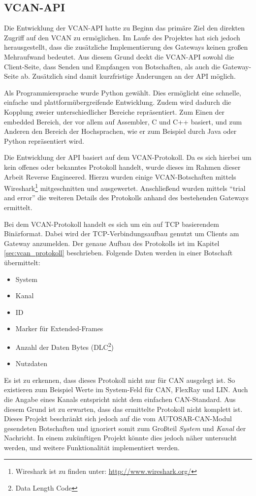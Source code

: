 \documentclass[
  a4paper,					    %
  twoside,
  DIV=calc,     				%
  bibliography=totoc,
  cleardoublepage=empty,
  ngerman,     					%
  final       					%
]{scrbook}
\begin{document}
\subsection{VCAN-API}
\label{sec:VCAN_API}
Die Entwicklung der VCAN-API hatte zu Beginn das primäre Ziel den direkten Zugriff auf den VCAN zu ermöglichen. Im Laufe des Projektes hat sich jedoch herausgestellt, dass die zusätzliche Implementierung des Gateways keinen großen Mehraufwand bedeutet. Aus diesem Grund deckt die VCAN-API sowohl die Client-Seite, dass Senden und Empfangen von Botschaften, als auch die Gateway-Seite ab. Zusätzlich sind damit kurzfristige Änderungen an der API möglich.

Als Programmiersprache wurde Python gewählt. Dies ermöglicht eine schnelle, einfache und plattformübergreifende Entwicklung. Zudem wird dadurch die Kopplung zweier unterschiedlicher Bereiche repräsentiert. Zum Einen der embedded Bereich, der vor allem auf Assembler, C und C++ basiert, und zum Anderen den Bereich der Hochsprachen, wie er zum Beispiel durch Java oder Python repräsentiert wird.

Die Entwicklung der API basiert auf dem VCAN-Protokoll. Da es sich hierbei um kein offenes oder bekanntes Protokoll handelt, wurde dieses im Rahmen dieser Arbeit Reverse Engineered. Hierzu wurden einige VCAN-Botschaften mittels Wireshark\footnote{Wireshark ist zu finden unter: \url{http://www.wireshark.org/}} mitgeschnitten und ausgewertet. Anschließend wurden mittels "`trial and error"' die weiteren Details des Protokolls anhand des bestehenden Gateways ermittelt.

Bei dem VCAN-Protokoll handelt es sich um ein auf TCP basierendem Binärformat. Dabei wird der TCP-Verbindungsaufbau genutzt um Clients am Gateway anzumelden. Der genaue Aufbau des Protokolls ist im Kapitel \ref{sec:vcan_protokoll} beschrieben. Folgende Daten werden in einer Botschaft übermittelt:

\begin{itemize}
    \item System
    \item Kanal
    \item ID
    \item Marker für Extended-Frames
    \item Anzahl der Daten Bytes (DLC\footnote{Data Length Code})
    \item Nutzdaten
\end{itemize}

Es ist zu erkennen, dass dieses Protokoll nicht nur für CAN ausgelegt ist. So existieren zum Beispiel Werte im System-Feld für CAN, FlexRay und LIN. Auch die Angabe eines Kanals entspricht nicht dem einfachen CAN-Standard. Aus diesem Grund ist zu erwarten, dass das ermittelte Protokoll nicht komplett ist. Dieses Projekt beschränkt sich jedoch auf die vom AUTOSAR-CAN-Modul gesendeten Botschaften und ignoriert somit zum Großteil \emph{System} und \emph{Kanal} der Nachricht. In einem zukünftigen Projekt könnte dies jedoch näher untersucht werden, und weitere Funktionalität implementiert werden.
\end{document}
